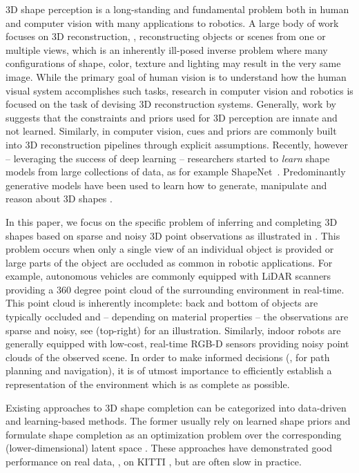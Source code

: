3D shape perception is a long-standing and fundamental problem both in human and computer vision \citep{Pizlo2007CAIP,Pizlo2010,Furukawa2013FTCGV} with many applications to robotics. A large body of work focuses on 3D reconstruction, \eg, reconstructing objects or scenes from one or multiple views, which is an inherently ill-posed inverse problem where many configurations of shape, color, texture and lighting may result in the very same image. While the primary goal of human vision is to understand how the human visual system accomplishes such tasks, research in computer vision and robotics is focused on the task of devising 3D reconstruction systems. Generally, work by \cite{Pizlo2010} suggests that the constraints and priors used for 3D perception are innate and not learned. Similarly, in computer vision, cues and priors are commonly built into 3D reconstruction pipelines through explicit assumptions. Recently, however -- leveraging the success of deep learning -- researchers started to \emph{learn} shape models from large collections of data, as for example ShapeNet~\citep{Chang2015ARXIV}. Predominantly generative models have been used to learn how to generate, manipulate and reason about 3D shapes  \citep{Girdhar2016ECCV,Brock2016ARXIV,Sharma2016ARXIV,Wu2016NIPS,Wu2015CVPR}.

In this paper, we focus on the specific problem of inferring and completing 3D shapes based on sparse and  noisy 3D point observations as illustrated in . This problem occurs when only a single view of an individual object is provided or large parts of the object are occluded as common in robotic applications. For example, autonomous vehicles are commonly equipped with LiDAR scanners providing a 360 degree point cloud of the surrounding environment in real-time. This point cloud is inherently incomplete: back and bottom of objects are typically occluded and -- depending on material properties -- the observations are sparse and noisy, see  (top-right) for an illustration. Similarly, indoor robots are generally equipped with low-cost, real-time RGB-D sensors providing noisy point clouds of the observed scene. In order to make informed decisions (\eg, for path planning and navigation), it is of utmost importance to efficiently establish a representation of the environment which is as complete as possible.

Existing approaches to 3D shape completion can be categorized into data-driven and learning-based methods. The former usually rely on learned shape priors and formulate shape completion as an optimization problem over the corresponding (lower-dimensional) latent space \citep{Rock2015CVPR,Haene2014CVPR,Li2015CGF,Engelmann2016GCPR,Nan2012TG,Bao2013CVPR,Dame2013CVPR,Ngyuen2016CVPR}. These approaches have demonstrated good performance on real data, \eg, on KITTI \citep{Geiger2012CVPR}, but are often slow in practice.

